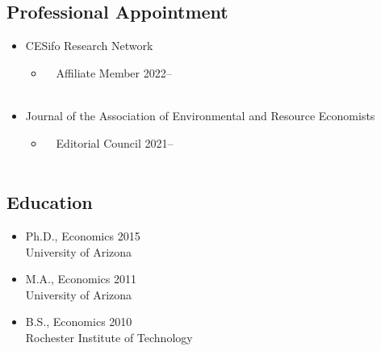 \documentclass[11pt]{res} %
\begin{document}
\begin{resume}
\subsection{Professional Appointment}
	\begin{itemize} \itemsep -12pt
		\item[] CESifo Research Network 
		\vspace{-0.05in} 
		\begin{itemize}
			\item[] \,\,\,\, Affiliate Member \hfill 2022--\\\
		\end{itemize}
		\vspace{-0.05in}
		\item[] Journal of the Association of Environmental and Resource Economists 
		\vspace{-0.05in} 
		\begin{itemize}
			\item[] \,\,\,\, Editorial Council \hfill 2021--\\\
		\end{itemize}
	\end{itemize}
\vspace{-0.5in}
\subsection{Education}


	\begin{itemize}
		\item[] Ph.D., Economics \hfill 2015\\
		University of Arizona

		\item[] M.A., Economics \hfill 2011\\
		University of Arizona

		\item[] B.S.,  Economics \hfill 2010\\
		Rochester Institute of Technology

	\end{itemize}
\vspace{-.2in}

\end{resume}
\end{document}

